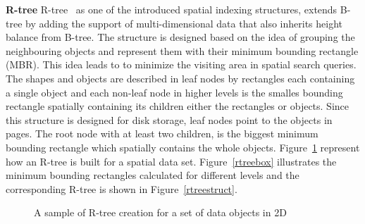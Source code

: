\documentclass[a4paper,12pt]{article}
\begin{document}
\textbf{R-tree}
R-tree~\cite{rtree} as one of the introduced spatial indexing structures, extends B-tree by adding the support of multi-dimensional data that also inherits height balance from B-tree. The structure is designed based on the idea of grouping the neighbouring objects and represent them with their minimum bounding rectangle (MBR). This idea leads to to minimize the visiting area in spatial search queries. The shapes and objects are described in leaf nodes by rectangles each containing a single object and each non-leaf node in higher levels is the smalles bounding rectangle spatially containing its children either the rectangles or objects. Since this structure is designed for disk storage, leaf nodes point to the objects in pages. The root node with at least two children, is the biggest minimum bounding rectangle which spatially contains the whole objects. Figure~\ref{rtree} represent how an R-tree is built for a spatial data set. Figure~\ref{rtreebox} illustrates the minimum bounding rectangles calculated for different levels
and the corresponding R-tree is shown in Figure~\ref{rtreestruct}.



\begin{figure}
\centering
{}
\centering
{}
\caption{A sample of R-tree creation for a set of data objects in 2D}
\label{rtree}
\end{figure}
\end{document}
